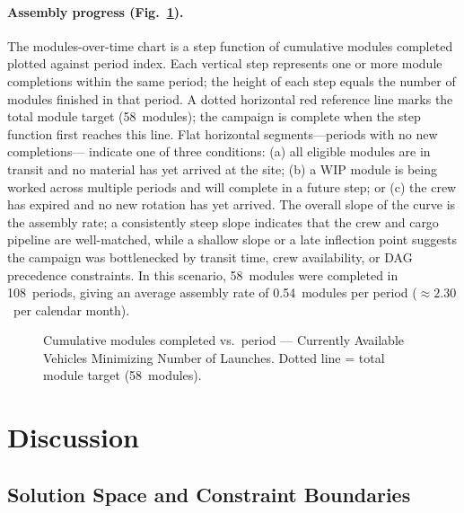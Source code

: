 \paragraph{Assembly progress (Fig.~\ref{fig:modules_1}).}
The modules-over-time chart is a step function of cumulative
modules completed plotted against period index.
Each vertical step represents one or more module completions
within the same period; the height of each step equals the
number of modules finished in that period.
A dotted horizontal red reference line marks the total module
target (58~modules); the campaign
is complete when the step function first reaches this line.
Flat horizontal segments---periods with no new completions---
indicate one of three conditions: (a) all eligible modules are
in transit and no material has yet arrived at the site;
(b) a WIP module is being worked across multiple periods and
will complete in a future step; or (c) the crew has expired
and no new rotation has yet arrived.
The overall slope of the curve is the assembly rate; a
consistently steep slope indicates that the crew and cargo
pipeline are well-matched, while a shallow slope or a late
inflection point suggests the campaign was bottlenecked by
transit time, crew availability, or DAG precedence constraints.
In this scenario, 58~modules were
completed in 108~periods, giving an
average assembly rate of
0.54~modules
per period
($\approx2.30$~per
calendar month).

\begin{figure}[htbp]
  \centering
  \resizebox{0.75\textwidth}{!}{}
  \caption{Cumulative modules completed vs.\ period ---
           Currently Available Vehicles Minimizing Number of Launches.
           Dotted line = total module target
           (58~modules).}
  \label{fig:modules_1}
\end{figure}



\section{Discussion}
\label{sec:discussion}


\subsection{Solution Space and Constraint Boundaries}

